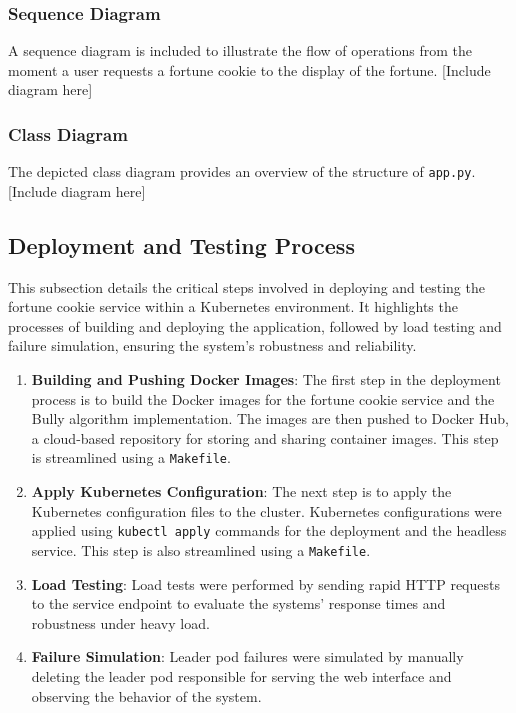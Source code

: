 \documentclass{article}
\begin{document}
  \subsubsection*{Sequence Diagram}
    A sequence diagram is included to illustrate the flow of operations from the moment a user requests a fortune cookie to the display of the fortune. [Include diagram here]

  \subsubsection*{Class Diagram}
    The depicted class diagram provides an overview of the structure of \texttt{app.py}. [Include diagram here]

      
  \subsection{Deployment and Testing Process}
    This subsection details the critical steps involved in deploying and testing the fortune cookie service within a Kubernetes environment. It highlights the processes of building and deploying the application, followed by load testing and failure simulation, ensuring the system's robustness and reliability.
    \begin{enumerate}
      \item \textbf{Building and Pushing Docker Images}: The first step in the deployment process is to build the Docker images for the fortune cookie service and the Bully algorithm implementation. The images are then pushed to Docker Hub, a cloud-based repository for storing and sharing container images. This step is streamlined using a \texttt{Makefile}.
      \item \textbf{Apply Kubernetes Configuration}: The next step is to apply the Kubernetes configuration files to the cluster. Kubernetes configurations were applied using \texttt{kubectl apply} commands for the deployment and the headless service. This step is also streamlined using a \texttt{Makefile}.
      \item \textbf{Load Testing}: Load tests were performed by sending rapid HTTP requests to the service endpoint to evaluate the systems' response times and robustness under heavy load.
      \item \textbf{Failure Simulation}: Leader pod failures were simulated by manually deleting the leader pod responsible for serving the web interface and observing the behavior of the system. 
    \end{enumerate}
\end{document}
